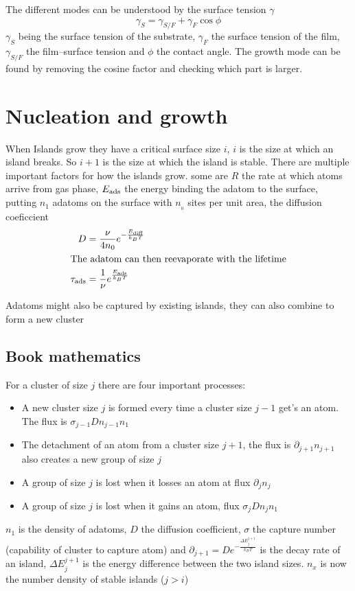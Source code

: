 \documentclass[article,oneside]{memoir}
\begin{document}

The different modes can be understood by the surface tension $\gamma$
\begin{equation*}
        \gamma_{S}=\gamma_{S/F}+\gamma_{F}\cos\phi
\end{equation*}
$\gamma_{S}$ being the surface tension of the substrate, $\gamma_{F}$ the surface tension of the film, $\gamma_{S/F}$ the film--surface tension and $\phi$ the contact angle. The growth mode can be found by removing the cosine factor and checking which part is larger.
\section{Nucleation and growth}
When Islands grow they have a critical surface size $i$, $i$ is the size at which an island breaks. So $i+1$ is the size at which the island is stable. There are multiple important factors for how the islands grow. some are $R$ the rate at which atoms arrive from gas phase, $E_{\textup{ads}}$ the energy binding the adatom to the surface, putting $n_{1}$ adatoms on the surface with $n_{_0}$ sites per unit area, the diffusion coeficcient 
\begin{align*}
        D&=\frac{\nu}{4n_{0}}e^{-\frac{E_{\textup{diff}}}{k_{B}T}}\\
        \intertext{The adatom can then reevaporate with the lifetime}
        \tau_{\textup{ads}}&=\frac{1}{\nu}e^{\frac{E_{\textup{ads}}}{k_{B}T}}\\
\end{align*}

Adatoms might also be captured by existing islands, they can also combine to form a new cluster




\subsection{Book mathematics}
For a cluster of size $j$ there are four important processes:
\begin{itemize}
        \item A new cluster size $j$ is formed every time a cluster size $j-1$ get's an atom. The flux is $\sigma_{j-1}Dn_{j-1}n_{1}$
        \item The detachment of an atom from a cluster size $j+1$, the flux is $\partial_{j+1}n_{j+1}$ also creates a new group of size $j$
        \item A group of size $j$ is lost when it losses an atom at flux $\partial_jn_j$
        \item A group of size $j$ is lost when it gains an atom, flux $\sigma_{j}Dn_jn_1$
\end{itemize}
$n_1$ is the density of adatoms, $D$ the diffusion coefficient, $\sigma$ the capture number (capability of cluster to capture atom) and $\partial_{j+1}= De^{-\frac{\Delta E_{j}^{j+1}}{k_{B}T}}$ is the decay rate of an island, $\Delta E_{j}^{j+1}$ is the energy difference between the two island sizes.
$n_{x}$ is now the number density of stable islands ($j>i$)
\end{document}

